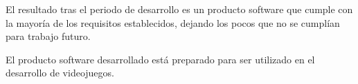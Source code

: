 El resultado tras el periodo de desarrollo es un producto software que cumple con la mayoría de los requisitos establecidos, dejando los pocos que no se cumplían para trabajo futuro.

El producto software desarrollado está preparado para ser utilizado en el desarrollo de videojuegos.